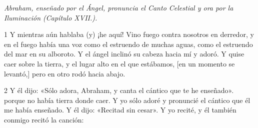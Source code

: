 \par \textit{Abraham, enseñado por el Ángel, pronuncia el Canto Celestial y ora por la Iluminación (Capítulo XVII.).}

\par 1 Y mientras aún hablaba (y) ¡he aquí! Vino fuego contra nosotros en derredor, y en el fuego había una voz como el estruendo de muchas aguas, como el estruendo del mar en su alboroto. Y el ángel inclinó su cabeza hacia mí y adoró. Y quise caer sobre la tierra, y el lugar alto en el que estábamos, [en un momento se levantó,] pero en otro rodó hacia abajo.

\par 2 Y él dijo: «Sólo adora, Abraham, y canta el cántico que te he enseñado». porque no había tierra donde caer. Y yo sólo adoré y pronuncié el cántico que él me había enseñado. Y él dijo: «Recitad sin cesar». Y yo recité, y él también conmigo recitó la canción:

